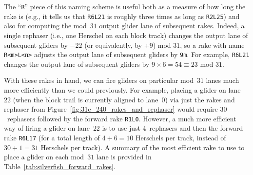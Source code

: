 The ``\texttt{R}'' piece of this naming scheme is useful both as a measure of how long the rake is (e.g., it tells us that \texttt{R6L21} is roughly three times as long as \texttt{R2L25}) and also for computing the mod~$31$ output glider lane of subsequent rakes. Indeed, a single rephaser (i.e., one Herschel on each block track) changes the output lane of subsequent gliders by $-22$ (or equivalently, by $+9$) mod $31$, so a rake with name \texttt{R<m>L<n>} adjusts the output lane of subsequent gliders by \texttt{9m}. For example, \texttt{R6L21} changes the output lane of subsequent gliders by $9 \times 6 = 54 \equiv 23$ mod $31$.

With these rakes in hand, we can fire gliders on particular mod~$31$ lanes much more efficiently than we could previously. For example, placing a glider on lane~$22$ (when the block trail is currently aligned to lane~$0$) via just the rakes and rephaser from Figure~\ref{fig:31c_240_rakes_and_rephaser} would require $30$~rephasers followed by the forward rake \texttt{R1L0}. However, a much more efficient way of firing a glider on lane~$22$ is to use just $4$~rephasers and then the forward rake \texttt{R6L17} (for a total length of $4 + 6 = 10$ Herschels per track, instead of $30 + 1 = 31$ Herschels per track). A summary of the most efficient rake to use to place a glider on each mod~$31$ lane is provided in Table~\ref{tab:silverfish_forward_rakes}.

